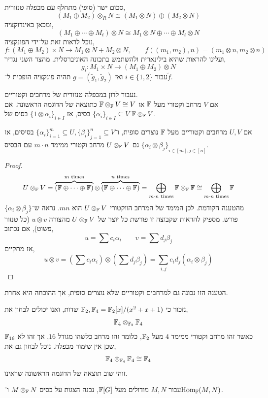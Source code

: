 \begin{example}
	סכום ישר (סופי) מתחלף עם מכפלה טנזורית,
	\[
		(M_1 \oplus M_2) \otimes_R N
		\cong (M_1 \otimes N) \oplus (M_2 \otimes N)
	\]
	ומכאן באינדוקציה,
	\[
		(M_1 \oplus \cdots \oplus M_t) \otimes N
		\cong M_1 \otimes N \oplus \cdots \oplus M_t \otimes N
	\]
	נוכל לראות זאת על־ידי הפונקציה,
	\[
		f : (M_1 \oplus M_2) \times N \to M_1 \otimes N + M_2 \otimes N,
		\qquad
		f((m_1, m_2), n)
		= (m_1 \otimes n, m_2 \otimes n)
	\]
	ועלינו להראות שהיא בילינארית ולהשתמש בתכונה האוניברסלית.
	מהצד השני נגדיר,
	\[
		g_i : M_1 \times N \to (M_1 \oplus M_2) \otimes N
	\]
	עבור $i \in \{1, 2\}$ ואז $g = (\tilde{g}_1, \tilde{g}_2)$ תהיה פונקציה הופכית ל־$\tilde{f}$.
\end{example}
נעבור לדון במכפלה טנזורית של מרחבים וקטוריים. \\
אם $V$ מרחב וקטורי מעל $\mathbb{F}$ אז $\mathbb{F} \otimes_{\mathbb{F}} V \cong V$ כתוצאה של הדוגמה הראשונה.
אם ${\{ \alpha_i \}}_{i \in I} \subseteq V$ בסיס, אז ${\{ 1 \otimes \alpha_i \}}_{i \in I}$ בסיס של $\mathbb{F} \otimes_{\mathbb{F}} V$.
\begin{proposition}
	אם $U, V$ מרחבים וקטוריים מעל $\mathbb{F}$ נוצרים סופית, ו־${\{ \alpha_i \}}_{i = 1}^m \subseteq U, {\{ \beta_i \}}_{j = 1}^n \subseteq V$ בסיסים,
	אז גם $U \otimes_{\mathbb{F}} V$ מרחב וקטורי ממימד $m \cdot n$ עם הבסיס ${\{ \alpha_i \otimes \beta_j \}}_{i \in [m], j \in [n]}$.
\end{proposition}
\begin{proof}
	\[
		U \otimes_{\mathbb{F}} V
		= \overbrace{(\mathbb{F} \oplus \cdots \oplus \mathbb{F})}^{m \text{ times}} \otimes \overbrace{(\mathbb{F} \oplus \cdots \oplus \mathbb{F})}^{n \text{ times}}
		= \bigoplus_{m \cdot n \text{ times}} \mathbb{F} \otimes_{\mathbb{F}} \mathbb{F}
		\cong \bigoplus_{m \cdot n \text{ times}} \mathbb{F}
	\]
	מהטענה הקודמת.
	לכן המימד של המרחב הווקטורי $U \otimes_{\mathbb{F}} V$ הוא $m n$.
	נראה ש־$\{ \alpha_i \otimes \beta_j \}$ פורש.
	מספיק להראות שקבוצה זו פורשת כל יוצר של $U \otimes_{\mathbb{F}} V$ מהצורה $u \otimes v$ (כל טנזור פשוט), אם נכתוב,
	\[
		u
		= \sum c_i \alpha_i
		\qquad
		v
		= \sum d_j \beta_j
	\]
	אז מתקיים,
	\[
		u \otimes v
		= \left(\sum c_i \alpha_i\right) \otimes \left(\sum d_j \beta_j\right)
		= \sum_{i, j} c_i d_j (\alpha_i \otimes \beta_j)
	\]
\end{proof}
\begin{remark}
	הטענה הזו נכונה גם למרחבים וקטוריים שלא נוצרים סופית, אך ההוכחה היא אחרת.
\end{remark}
\begin{example}
	נזכור כי $\mathbb{F}_2, \mathbb{F}_4 = \mathbb{F}_2[x] / (x^2 + x + 1)$ שדות, ואנו יכולים לבחון את,
	\[
		\mathbb{F}_4 \otimes_{\mathbb{F}_2} \mathbb{F}_4
	\]
	כאשר זהו מרחב וקטורי ממימד $4$ מעל $\mathbb{F}_2$, כלומר זהו מרחב כלשהו מגודל $16$, אך זהו לא $\mathbb{F}_{16}$ שכן אין שימור מכפלה.
	נוכל לבחון גם את,
	\[
		\mathbb{F}_4 \otimes_{\mathbb{F}_4} \mathbb{F}_4
		\cong \mathbb{F}_4
	\]
	זוהי שוב תוצאה של הדוגמה הראשונה שראינו.
\end{example}
עבור $M, N$ מודולים מעל $\mathbb{F}[G]$, נבנה הצגות על בסיס $M \otimes_{\mathbb{F}} N$ ו־$\operatorname{Hom}_{\mathbb{F}}(M, N)$.

